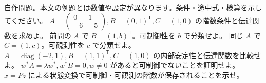 \documentclass[11pt]{article}
\begin{document}
自作問題。本文の例題とは数値や設定が異なります。条件・途中式・検算を示してください。
\problem[可制御と可観測]
$A=\begin{pmatrix}0&1\\-6&-5\end{pmatrix},B=(0,1)^{\mathsf T},C=(1,0)$ の階数条件と伝達関数を求めよ。
\workspace{45mm}
\problem[文字入り入力]
前問の $A$ で $B=(1,b)^{\mathsf T}$。可制御性を $b$ で分類せよ。
\workspace{45mm}
\newpage
\problem[文字入り出力]
同じ $A$ で $C=(1,c)$。可観測性を $c$ で分類せよ。
\workspace{45mm}
\problem[隠れた不安定性]
$A=\operatorname{diag}(-2,1),B=(1,1)^{\mathsf T},C=(1,0)$ の内部安定性と伝達関数を比較せよ。
\workspace{45mm}
\newpage
\problem[PBHの必要性]
$w^*A=\lambda w^*,w^*B=0,w\ne0$ があると可制御でないことを証明せよ。
\workspace{45mm}
\problem[基底変換]
$x=Pz$ による状態変換で可制御・可観測の階数が保存されることを示せ。
\workspace{45mm}
\end{document}
